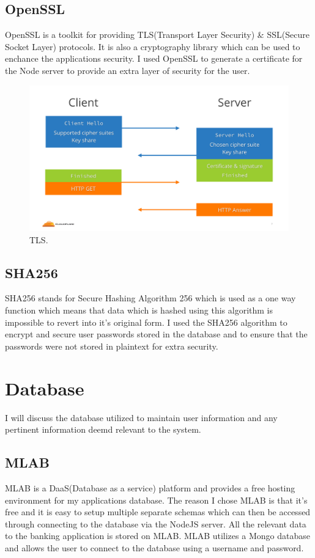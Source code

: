 \subsection{OpenSSL}
OpenSSL is a toolkit for providing TLS(Transport Layer Security) \& SSL(Secure Socket Layer) protocols.  It is also a cryptography library which can be used to enchance the applications security.  I used OpenSSL to generate a certificate for the Node server to provide an extra layer of security for the user.
\\
\begin{figure}[H]
  \includegraphics[width=\textwidth]{img/tls.png}
  \caption{TLS.}
  \label{fig: How TLS Works}
\end{figure}
\cite{TLS}
\subsection{SHA256}
SHA256 stands for Secure Hashing Algorithm 256 which is used as a one way function which means that data which is hashed using this algorithm is impossible to revert into it's original form\cite{SHA256}.  I used the SHA256 algorithm to encrypt and secure user passwords stored in the database and to ensure that the passwords were not stored in plaintext for extra security.
\section{Database}
I will discuss the database utilized to maintain user information and any pertinent information deemd relevant to the system.
\subsection{MLAB}
MLAB is a DaaS(Database as a service) platform and provides a free hosting environment for my applications database\cite{MLAB}.  The reason I chose MLAB is that it's free and it is easy to setup multiple separate schemas which can then be accessed through connecting to the database via the NodeJS server.  All the relevant data to the banking application is stored on MLAB.  MLAB utilizes a Mongo database and allows the user to connect to the database using a username and password.
